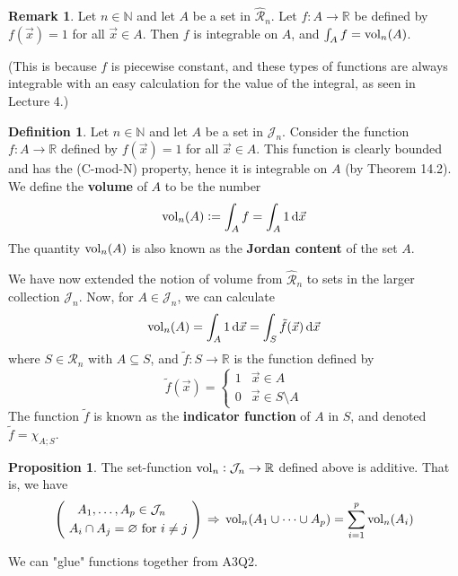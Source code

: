 \documentclass[11pt]{article}
\makeatletter
\theoremstyle{definition}
\newtheorem{defn}[thm]{Definition}
\newtheorem{prop}[thm]{Proposition}
\newtheorem{remark}[thm]{Remark}
\newcommand{\N}{\ensuremath{\mathbb{N}}}
\newcommand{\R}{\ensuremath{\mathbb{R}}}
\newenvironment{pf}[1][\proofname]{\par
  \pushQED{\qed}%
  \normalfont \topsep0\p@\relax
  \trivlist
  \item[\hskip\labelsep\itshape
  #1\@addpunct{.}]\ignorespaces
}{%
  \popQED\endtrivlist\@endpefalse
}
\makeatother
\begin{document}
\begin{remark}
Let $n \in \N$ and let $A$ be a set in $\widehat{\mathcal{R}}_n$. Let $f : A \to \R$ be defined by $f(\vec{x}) = 1$ for all $\vec{x} \in A$. Then $f$ is integrable on $A$, and $\int_A f = {\rm vol}_n(A)$.

(This is because $f$ is piecewise constant, and these types of functions are always integrable with an easy calculation for the value of the integral, as seen in Lecture 4.)
\end{remark}

\begin{defn}
Let $n \in \N$ and let $A$ be a set in $\mathcal{J}_n$. Consider the function $f : A \to \R$ defined by $f(\vec{x}) = 1$ for all $\vec{x} \in A$. This function is clearly bounded and has the (C-mod-N) property, hence it is integrable on $A$ (by Theorem 14.2). We define the {\bf volume} of $A$ to be the number
$${\rm vol}_n(A) := \int_A f = \int_A 1\,{\rm d}\vec{x}$$
The quantity ${\rm vol}_n(A)$ is also known as the {\bf Jordan content} of the set $A$.

We have now extended the notion of volume from $\widehat{\mathcal{R}}_n$ to sets in the larger collection $\mathcal{J}_n$. Now, for $A \in \mathcal{J}_n$, we can calculate
$${\rm vol}_n(A) = \int_A 1\,{\rm d}\vec{x} = \int_S \tilde{f}(\vec{x})\,{\rm d}\vec{x}$$
where $S \in \mathcal{R}_n$ with $A \subseteq S$, and $\tilde{f} : S \to \R$ is the function defined by
$$\tilde{f}(\vec{x}) = \begin{cases} 1 & \vec{x} \in A \\ 0 & \vec{x} \in S \setminus A \end{cases}$$
The function $\tilde{f}$ is known as the {\bf indicator function} of $A$ in $S$, and denoted $\tilde{f} = \chi_{A; S}$. 
\end{defn}

\begin{prop}
The set-function ${\rm vol}_n : \mathcal{J}_n \to \R$ defined above is additive. That is, we have
$$\left( \begin{aligned} &\quad A_1, \dots, A_p \in \mathcal{J}_n \\ &\text{ $A_i \cap A_j = \varnothing$ for $i \neq j$ } \end{aligned} \right) \, \Rightarrow \, {\rm vol}_n(A_1 \cup \cdots \cup A_p) = \sum_{i=1}^p {\rm vol}_n(A_i)$$
\begin{pf}
We can "glue" functions together from A3Q2.
\end{pf}
\end{prop}
\end{document}
